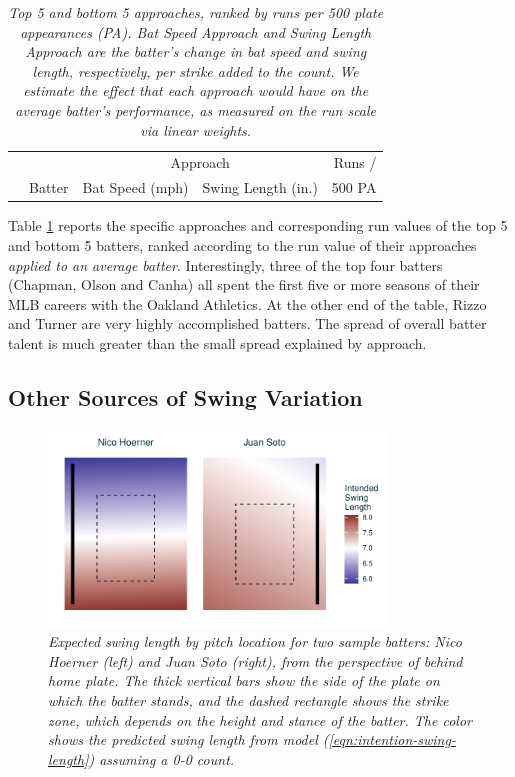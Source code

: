 \documentclass{article}
\begin{document}
      \begin{table}
        \centering
        \begin{tabular}{rl|rr|r}
          &        & \multicolumn{2}{c|}{Approach}          & Runs /\\
          & Batter & Bat Speed (mph)  & Swing Length (in.)  & 500 PA\\
          \hline
          
        \end{tabular}
        \caption{\it Top 5 and bottom 5 approaches, ranked by runs per 500 plate appearances (PA). Bat Speed Approach and Swing Length Approach are the batter's change in bat speed and swing length, respectively, per strike added to the count. We estimate the effect that each approach would have on the average batter's performance, as measured on the run scale via linear weights.}
        \label{tab:approach-ranked}
      \end{table}

      Table \ref{tab:approach-ranked} reports the specific approaches and corresponding run values of the top 5 and bottom 5 batters, ranked according to the run value of their approaches {\it applied to an average batter}. Interestingly, three of the top four batters (Chapman, Olson and Canha) all spent the first five or more seasons of their MLB careers with the Oakland Athletics. At the other end of the table, Rizzo and Turner are very highly accomplished batters. The spread of overall batter talent is much greater than the small spread explained by approach.

    \subsection{Other Sources of Swing Variation}
    \label{sec:results-other}

      \begin{figure}
        \centering
        \includegraphics[width = 0.8\textwidth]{../../figures/adaptation.pdf}
        \caption{\it Expected swing length by pitch location for two sample batters: Nico Hoerner (left) and Juan Soto (right), from the perspective of behind home plate. The thick vertical bars show the side of the plate on which the batter stands, and the dashed rectangle shows the strike zone, which depends on the height and stance of the batter. The color shows the predicted swing length  from model (\ref{eqn:intention-swing-length}) assuming a 0-0 count.}
        \label{fig:adaptation}
      \end{figure}
\end{document}
